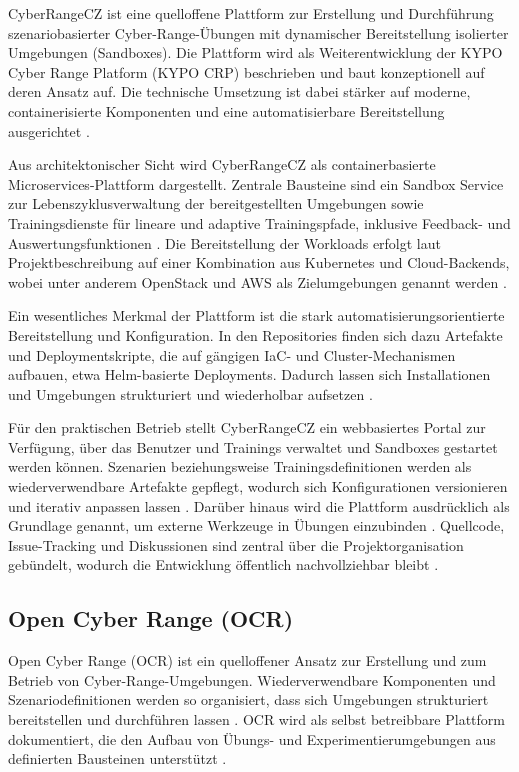 CyberRangeCZ ist eine quelloffene Plattform zur Erstellung und Durchführung szenariobasierter
Cyber-Range-Übungen mit dynamischer Bereitstellung isolierter Umgebungen (Sandboxes). Die Plattform
wird als Weiterentwicklung der KYPO Cyber Range Platform (KYPO CRP) beschrieben und baut
konzeptionell auf deren Ansatz auf. Die technische Umsetzung ist dabei stärker auf moderne,
containerisierte Komponenten und eine automatisierbare Bereitstellung ausgerichtet
\cite{CyberRangeCZCyberRanges,CyberRangeCZGitHub}.

Aus architektonischer Sicht wird CyberRangeCZ als containerbasierte Microservices-Plattform
dargestellt. Zentrale Bausteine sind ein Sandbox Service zur Lebenszyklusverwaltung der
bereitgestellten Umgebungen sowie Trainingsdienste für lineare und adaptive Trainingspfade,
inklusive Feedback- und Auswertungsfunktionen \cite{CyberRangeCZGitHub}. Die Bereitstellung der
Workloads erfolgt laut Projektbeschreibung auf einer Kombination aus Kubernetes und Cloud-Backends,
wobei unter anderem OpenStack und AWS als Zielumgebungen genannt werden \cite{CyberRangeCZGitHub}.

Ein wesentliches Merkmal der Plattform ist die stark automatisierungsorientierte Bereitstellung und
Konfiguration. In den Repositories finden sich dazu Artefakte und Deploymentskripte, die auf
gängigen IaC- und Cluster-Mechanismen aufbauen, etwa Helm-basierte Deployments. Dadurch lassen sich
Installationen und Umgebungen strukturiert und wiederholbar aufsetzen
\cite{CyberRangeCZGitHub,CyberRangeCZDocs}.

Für den praktischen Betrieb stellt CyberRangeCZ ein webbasiertes Portal zur Verfügung, über das
Benutzer und Trainings verwaltet und Sandboxes gestartet werden können. Szenarien
beziehungsweise Trainingsdefinitionen werden als wiederverwendbare Artefakte gepflegt, wodurch sich
Konfigurationen versionieren und iterativ anpassen lassen \cite{CyberRangeCZGitHub}. Darüber hinaus
wird die Plattform ausdrücklich als Grundlage genannt, um externe Werkzeuge in Übungen einzubinden
\cite{CyberRangeCZCyberRanges}. Quellcode, Issue-Tracking und Diskussionen sind zentral über die
Projektorganisation gebündelt, wodurch die Entwicklung öffentlich nachvollziehbar bleibt
\cite{CyberRangeCZGitHub}.

\subsection{Open Cyber Range (OCR)}
\label{subsec:ocr}

Open Cyber Range (OCR) ist ein quelloffener Ansatz zur Erstellung und zum Betrieb von
Cyber-Range-Umgebungen. Wiederverwendbare Komponenten und Szenariodefinitionen werden so
organisiert, dass sich Umgebungen strukturiert bereitstellen und durchführen lassen
\cite{OCRDocs,OCRGitHub}. OCR wird als selbst betreibbare Plattform dokumentiert, die den Aufbau von
Übungs- und Experimentierumgebungen aus definierten Bausteinen unterstützt \cite{OCRDocs}.

